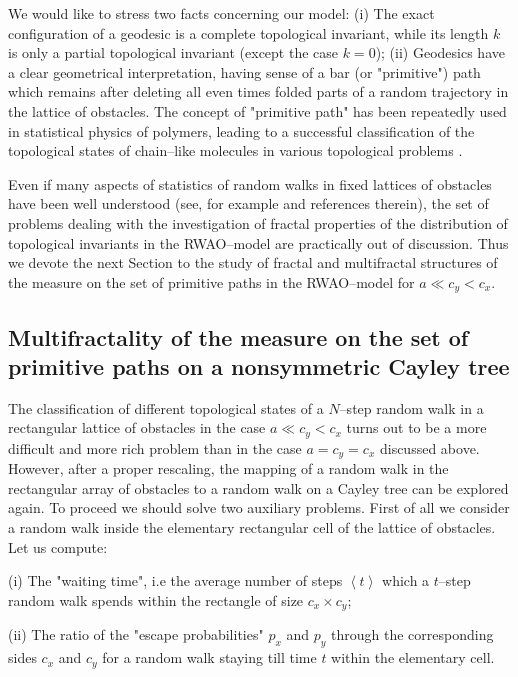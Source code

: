 We would like  to stress two facts concerning our model: (i) The exact
configuration of a geodesic is a complete topological invariant, while its
length $k$ is only a partial topological invariant  (except the case $k=0$); (ii) Geodesics have
a clear geometrical interpretation, having sense of a bar (or "primitive") path
which remains after deleting all even times folded parts of a  random trajectory
in the lattice of obstacles. The concept of  "primitive path" has been repeatedly
used in statistical physics of polymers, leading to a successful classification of the topological states of chain--like molecules in various topological problems
\cite{ne_kh_sem,khter,helf_rub}.

Even if  many aspects of statistics of random walks in fixed lattices of
obstacles have been  well understood (see, for example \cite{nechaev} and
references therein), the set of problems dealing with the investigation of
fractal properties of the distribution of topological invariants  in the
RWAO--model are practically out of discussion. Thus we devote the next
Section to the study of fractal and multifractal structures of the
measure on the set  of primitive paths in the RWAO--model for $a\ll c_y<c_x$.

\subsection{Multifractality of the measure on the set of primitive
paths on a  nonsymmetric Cayley tree} \label{1:sect:2.2}

The classification of different topological states of a $N$--step random walk
in a rectangular lattice of obstacles in the case $a\ll c_y<c_x$ turns out to be
a more difficult and more rich problem than in the case $a=c_y=c_x$
discussed above. However, after a proper rescaling, the
mapping of a random walk in the rectangular array of obstacles to a
random walk on a Cayley tree can be explored again. To proceed we should
solve two auxiliary problems. First of all we consider a  random walk inside the
elementary rectangular cell of the lattice of obstacles. Let us compute:

(i) The "waiting time", i.e the average number of steps
$\left<t\right>$ which a $t$--step random walk spends within the rectangle of
size $c_x\times c_y$;

(ii) The ratio of the "escape probabilities" $p_x$ and $p_y$
through the corresponding sides $c_x$ and $c_y$ for a random walk staying
till time $t$ within the elementary cell.

